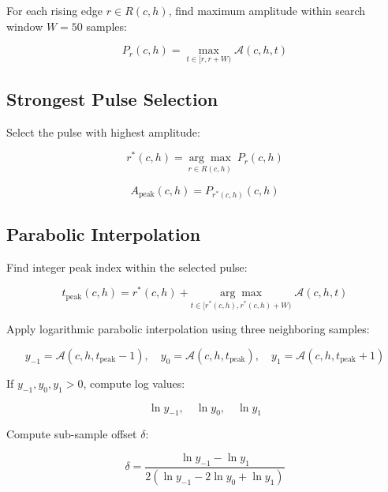 \documentclass[11pt]{article}
\begin{document}
For each rising edge $r \in R(c, h)$, find maximum amplitude within search window $W = 50$ samples:

\begin{equation}
P_r(c, h) = \max_{t \in [r, r+W)} \mathcal{A}(c, h, t)
\end{equation}

\subsection{Strongest Pulse Selection}

Select the pulse with highest amplitude:

\begin{equation}
r^*(c, h) = \underset{r \in R(c, h)}{\arg\max} \; P_r(c, h)
\end{equation}

\begin{equation}
A_{\text{peak}}(c, h) = P_{r^*(c,h)}(c, h)
\end{equation}

\subsection{Parabolic Interpolation}

Find integer peak index within the selected pulse:

\begin{equation}
t_{\text{peak}}(c, h) = r^*(c, h) + \underset{t \in [r^*(c,h), r^*(c,h)+W)}{\arg\max} \; \mathcal{A}(c, h, t)
\end{equation}

Apply logarithmic parabolic interpolation using three neighboring samples:

\begin{equation}
y_{-1} = \mathcal{A}(c, h, t_{\text{peak}}-1), \quad y_0 = \mathcal{A}(c, h, t_{\text{peak}}), \quad y_1 = \mathcal{A}(c, h, t_{\text{peak}}+1)
\end{equation}

If $y_{-1}, y_0, y_1 > 0$, compute log values:

\begin{equation}
\ln y_{-1}, \quad \ln y_0, \quad \ln y_1
\end{equation}

Compute sub-sample offset $\delta$:

\begin{equation}
\delta = \frac{\ln y_{-1} - \ln y_1}{2(\ln y_{-1} - 2\ln y_0 + \ln y_1)}
\end{equation}
\end{document}
